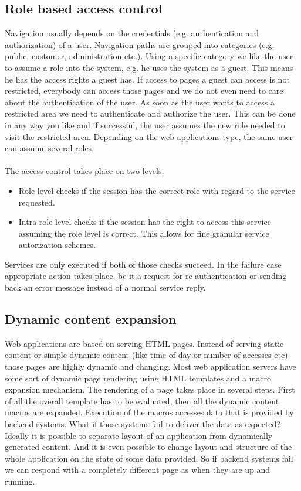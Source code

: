 \subsection{Role based access control}
Navigation usually depends on the credentials (e.g. authentication and
authorization) of a user. Navigation paths are grouped into categories (e.g.
public, customer, administration etc.). Using a specific category we like the
user to assume a role into the system, e.g. he uses the system as a guest. This
means he has the access rights a guest has. If access to pages a guest can
access is not restricted, everybody can access those pages and we do not even
need to care about the authentication of the user. As soon as the user wants to
access a restricted area we need to authenticate and authorize the user. This
can be done in any way you like and if successful, the user assumes the new role
needed to visit the restricted area. Depending on the web applications type, the
same user can assume several roles.\\
\\
The access control takes place on two levels:
\begin{itemize}
  \item Role level checks if the session has the correct role with regard to the
  service requested.
  \item Intra role level checks if the session has the right to access this
  service assuming the role level is correct. This allows for fine granular service autorization schemes.
\end{itemize}
Services are only executed if both of those checks succeed. In the failure case
appropriate action takes place, be it a request for re-authentication or sending
back an error message instead of a normal service reply.

\subsection{Dynamic content expansion}
Web applications are based on serving HTML pages. Instead of serving static
content or simple dynamic content (like time of day or number of accesses etc)
those pages are highly dynamic and changing. Most web application servers have
some sort of dynamic page rendering using HTML templates and a macro expansion
mechanism. The rendering of a page takes place in several steps. First of all
the overall template has to be evaluated, then all the dynamic content macros
are expanded. Execution of the macros accesses data that is provided by backend
systems. What if those systems fail to deliver the data as expected? Ideally it
is possible to separate layout of an application from dynamically generated
content. And it is even possible to change layout and structure of the whole
application on the state of some data provided. So if backend systems fail we
can respond with a completely different page as when they are up and running.

